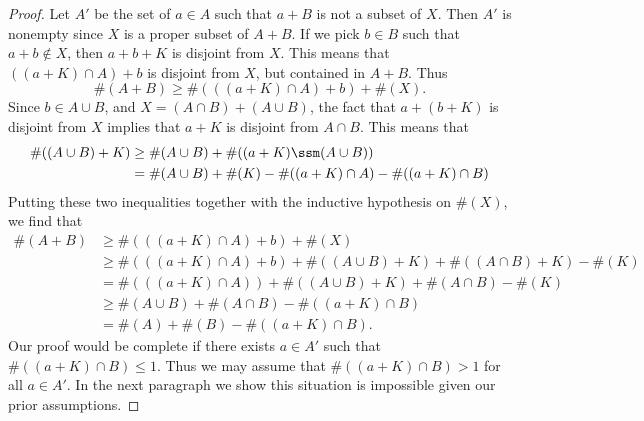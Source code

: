 \begin{proof}
    Let $A'$ be the set of $a \in A$ such that $a + B$ is not a subset of $X$. Then $A'$ is nonempty since $X$ is a proper subset of $A + B$. If we pick $b \in B$ such that $a + b \not \in X$, then $a + b + K$ is disjoint from $X$. This means that $((a + K) \cap A) + b$ is disjoint from $X$, but contained in $A + B$. Thus
    \[ \#(A + B) \geq \#(((a + K) \cap A) + b) + \#(X). \]
    Since $b \in A \cup B$, and $X = (A \cap B) + (A \cup B)$, the fact that $a + (b + K)$ is disjoint from $X$ implies that $a + K$ is disjoint from $A \cap B$. This means that
    \begin{align*}
        \#((A \cup B) + K) &\geq \#(A \cup B) + \#((a + K) \ssm (A \cup B))\\
        &= \#(A \cup B) + \#(K) - \#((a + K) \cap A) - \#((a + K) \cap B)
    \end{align*}
    Putting these two inequalities together with the inductive hypothesis on $\#(X)$, we find that
    \begin{align*}
        \#(A + B) &\geq \#(((a + K) \cap A) + b) + \#(X)\\
        &\geq \#(((a + K) \cap A) + b) + \#((A \cup B) + K) + \#((A \cap B) + K) - \#(K)\\
        &= \#(((a + K) \cap A)) + \#((A \cup B) + K) + \#(A \cap B) - \#(K)\\
        &\geq \#(A \cup B) + \#(A \cap B) - \#((a + K) \cap B)\\
        &= \#(A) + \#(B) - \#((a + K) \cap B).
    \end{align*}
    Our proof would be complete if there exists $a \in A'$ such that $\#((a + K) \cap B) \leq 1$. Thus we may assume that $\#((a + K) \cap B) > 1$ for all $a \in A'$. In the next paragraph we show this situation is impossible given our prior assumptions.


\end{proof}
